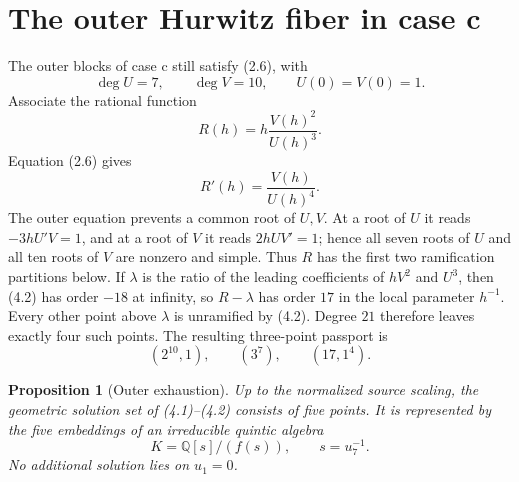 \documentclass[11pt]{article}
\newtheorem{proposition}[theorem]{Proposition}
\theoremstyle{definition}
\theoremstyle{remark}
\newcommand{\Q}{\mathbb Q}
\begin{document}
\section{The outer Hurwitz fiber in case c}\label{sec:hurwitz}

The outer blocks of case c still satisfy (2.6), with
\[
 \deg U=7,\qquad \deg V=10,\qquad U(0)=V(0)=1.          \tag{4.1}
\]
Associate the rational function
\[
   R(h)=h\frac{V(h)^2}{U(h)^3}.
\]
Equation (2.6) gives
\[
   R'(h)=\frac{V(h)}{U(h)^4}.                           \tag{4.2}
\]
The outer equation prevents a common root of \(U,V\).  At a root of
\(U\) it reads \(-3hU'V=1\), and at a root of \(V\) it reads
\(2hUV'=1\); hence all seven roots of \(U\) and all ten roots of \(V\)
are nonzero and simple.  Thus \(R\) has the first two ramification
partitions below.  If \(\lambda\) is the ratio of the leading
coefficients of \(hV^2\) and \(U^3\), then (4.2) has order \(-18\) at
infinity, so \(R-\lambda\) has order \(17\) in the local parameter
\(h^{-1}\).  Every other point above \(\lambda\) is unramified by
(4.2).  Degree \(21\) therefore leaves exactly four such points.
The resulting three-point passport is
\[
 (2^{10},1),\qquad(3^7),\qquad(17,1^4).                \tag{4.3}
\]

\begin{proposition}[Outer exhaustion]\label{prop:outer}
Up to the normalized source scaling, the geometric solution set of
(4.1)--(4.2) consists of five points.  It is represented by the five
embeddings of an irreducible quintic algebra
\[
   K=\Q[s]/(f(s)),\qquad s=u_7^{-1}.
\]
No additional solution lies on \(u_1=0\).
\end{proposition}
\end{document}
